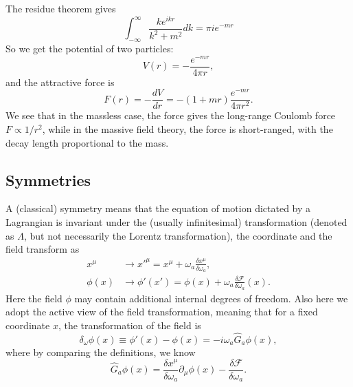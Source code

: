 \documentclass[aps,prb,superscriptaddress,nofootinbib]{revtex4}
\begin{document}
The residue theorem gives
\begin{equation}
	\int_{-\infty}^\infty \frac{k e^{ikr}}{k^2 +m^2} dk = \pi ie^{-mr}
\end{equation}
So we get the potential of two particles:
\begin{equation}\label{eq:field-to-force}
	V(r) = -\frac{e^{-mr}}{4\pi r},
\end{equation}
and the attractive force is
\begin{equation}
	F(r) = -\frac{dV}{dr} = -(1+mr)\frac{e^{-mr}}{4\pi r^2}.
\end{equation}
We see that in the massless case, the force gives the long-range Coulomb force $F \propto 1/r^2$, while in the massive field theory, the force is short-ranged, with the decay length proportional to the mass.


\subsection{Symmetries}

A (classical) symmetry means that the equation of motion dictated by a Lagrangian is invariant under the (usually infinitesimal) transformation (denoted as $\Lambda$, but not necessarily the Lorentz transformation), the coordinate and the field transform as
\begin{equation}
\begin{aligned}
	x^\mu &\rightarrow {x'}^\mu = x^\mu + \omega_a \frac{\delta x^\mu}{\delta \omega_a}, \\
	\phi(x) &\rightarrow \phi'(x') = \phi(x) + \omega_a \frac{\delta \mathcal F}{\delta \omega_a}(x).
\end{aligned}
\end{equation}
Here the field $\phi$ may contain additional internal degrees of freedom. 
Also here we adopt the active view of the field transformation, meaning that for a fixed coordinate $x$, the transformation of the field is
\begin{equation}
	\delta_\omega \phi(x) \equiv \phi'(x) - \phi(x) = - i\omega_a \hat G_a \phi(x),
\end{equation}
where by comparing the definitions, we know
\begin{equation}
	\hat G_a\phi(x) = \frac{\delta x^\mu}{\delta\omega_a} \partial_\mu \phi(x) - \frac{\delta\mathcal F}{\delta\omega_a}.
\end{equation}
\end{document}
